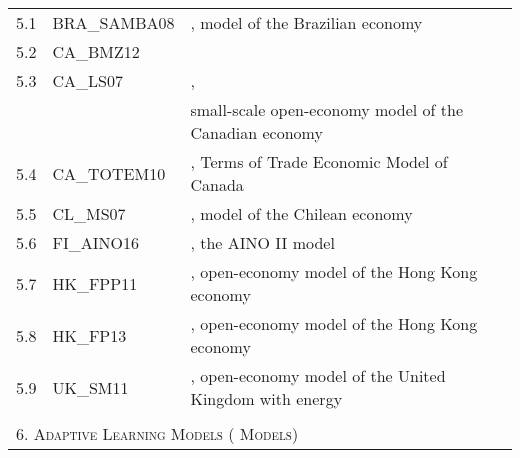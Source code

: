 \documentclass[11pt,a4paper]{article}
\begin{document}
\begin{table}[H]
\begin{tabularx}{\textwidth}{lll}
			5.1 & BRA\_SAMBA08 & \cite{Gouveaetal2008}, model of the Brazilian economy \\
			5.2 & CA\_BMZ12 & \cite{Bailliuetal2012}  \\
			
			5.3 & CA\_LS07 & \cite{LubikSchorfheide2007},\\
			&& small-scale open-economy model of the Canadian economy \\
			
			5.4\footnotemark[1] & CA\_TOTEM10 & \cite{murchison2006rennison}, Terms of Trade Economic Model of Canada\\%
			
			5.5 & CL\_MS07 & \cite{MedinaSoto2007}, model of the Chilean economy \\
			
			5.6 & FI\_AINO16 & \cite{kilponen2016aino}, the AINO II model \\
			
			5.7\footnotemark[1] & HK\_FPP11 & \cite{FunkePaetzPytlarczyk2011}, open-economy model of the Hong Kong economy\\%
			5.8 & HK\_FP13 & \cite{FunkePaetz2013}, open-economy model of the Hong Kong economy \\
			5.9&UK\_SM11 & \cite{millard2011estimated}, open-economy model of the United Kingdom with energy\\
			&& \\
			
			\multicolumn{3}{l}{\textsc{6. Adaptive Learning Models (\the\value{ALnumber} Models)} } \\
			

\end{tabularx}
\end{table}
\end{document}
